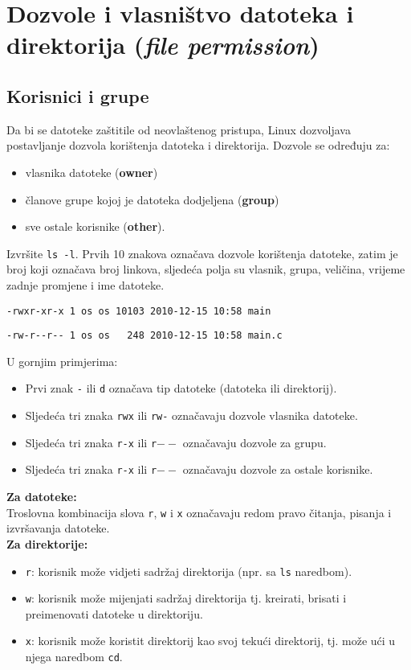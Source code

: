 \section{Dozvole i vlasništvo datoteka i direktorija (\textit{file permission})}
\subsection*{Korisnici i grupe}
Da bi se datoteke zaštitile od neovlaštenog pristupa, Linux dozvoljava postavljanje dozvola korištenja datoteka i direktorija. Dozvole se određuju za:
\begin{itemize}
 \item vlasnika datoteke (\textbf{owner})
\item članove grupe kojoj je datoteka dodjeljena (\textbf{group})
\item sve ostale korisnike (\textbf{other}).
\end{itemize}
\begin{primjer} Izvršite \texttt{ls -l}. Prvih 10 znakova označava dozvole korištenja datoteke, zatim je broj koji označava broj linkova, sljedeća polja su vlasnik, grupa, veličina, 
vrijeme zadnje promjene i ime datoteke.

\lstinline!-rwxr-xr-x 1 os os 10103 2010-12-15 10:58 main !

\lstinline!-rw-r--r-- 1 os os   248 2010-12-15 10:58 main.c!
\end{primjer}
U gornjim primjerima:
\begin{itemize}
 \item Prvi znak \texttt{-} ili \texttt{d} označava tip datoteke (datoteka ili direktorij).
\item Sljedeća tri znaka \texttt{rwx} ili \texttt{rw-} označavaju dozvole vlasnika datoteke.
\item Sljedeća tri znaka \texttt{r-x} ili \texttt{r$--$} označavaju dozvole za grupu.
\item Sljedeća tri znaka \texttt{r-x} ili \texttt{r$--$} označavaju dozvole za ostale korisnike.
\end{itemize}
\textbf{Za datoteke:}\\
Troslovna kombinacija slova \texttt{r}, \texttt{w} i \texttt{x} označavaju redom pravo čitanja, pisanja i izvršavanja datoteke.\\
\textbf{Za direktorije:}
 \begin{itemize}
\item 
\texttt{r}: korisnik može vidjeti sadržaj direktorija (npr. sa \texttt{ls} naredbom).                                                                                                            
\item \texttt{w}: korisnik može mijenjati sadržaj direktorija tj. kreirati, brisati i preimenovati datoteke u direktoriju.
\item \texttt{x}: korisnik može koristit direktorij kao svoj tekući direktorij, tj. može ući u njega naredbom \texttt{cd}. 
\end{itemize}
